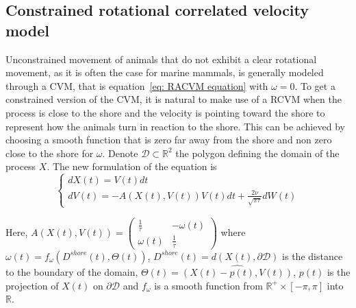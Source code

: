 \documentclass[11pt]{article}
\newcommand {\R}{\mathbb{R}}
\newcommand {\1}{\mathbb{1}}
\begin{document}
\subsection{Constrained rotational correlated velocity model}
\label{section: CRCVM}

Unconstrained movement of animals that do not exhibit a clear rotational movement, as it is often the case for marine mammals, is generally modeled through a CVM, that is equation~\ref{eq: RACVM equation} with $\omega=0$.
To get a constrained version of the CVM, it is natural to make use of a RCVM when the process is close to the shore and the velocity is pointing toward the shore to represent how the animals turn in reaction to the shore.
This can be achieved by choosing a smooth function that is zero far away from the shore and non zero close to the shore for $\omega$.
Denote $\mathcal{D} \subset \R^2$ the polygon defining the domain of the process $X$. The new formulation of the equation is 
\begin{equation} \left\{
	\begin{array}{l}
		dX(t)=V(t) dt \\
		dV(t)=-A(X(t),V(t))V(t)dt+\frac{2\nu}{\sqrt{\pi \tau}} dW(t) 
		
	\end{array}
	\right.
	\label{eq: CRCVM equation}
\end{equation}

Here, $A(X(t),V(t))=\begin{pmatrix} 
	\frac{1}{\tau} & -\omega(t) \\
	\omega(t) & \frac{1}{\tau}
\end{pmatrix}$
where $\omega(t)=f_{\omega}(D^{shore}(t),\Theta(t))$, $D^{shore}(t)=d(X(t),\partial\mathcal{D})$ is the distance to the boundary of the domain,
$\Theta(t)=\widehat{(X(t)-p(t),V(t))}$, $p(t)$ is the projection of $X(t)$ on $\partial \mathcal{D}$ and $f_{\omega}$ is a smooth function from $\R^{+} \times [-\pi,\pi]$ into $\R$.
\end{document}
